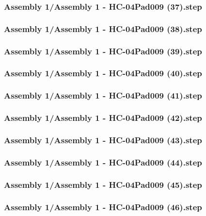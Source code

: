 \documentclass[a4paper,12pt]{article}
\begin{document}
\subsubsection{Assembly 1/Assembly 1 - HC-04Pad009 (37).step}

\subsubsection{Assembly 1/Assembly 1 - HC-04Pad009 (38).step}

\subsubsection{Assembly 1/Assembly 1 - HC-04Pad009 (39).step}

\subsubsection{Assembly 1/Assembly 1 - HC-04Pad009 (40).step}

\subsubsection{Assembly 1/Assembly 1 - HC-04Pad009 (41).step}

\subsubsection{Assembly 1/Assembly 1 - HC-04Pad009 (42).step}

\subsubsection{Assembly 1/Assembly 1 - HC-04Pad009 (43).step}

\subsubsection{Assembly 1/Assembly 1 - HC-04Pad009 (44).step}

\subsubsection{Assembly 1/Assembly 1 - HC-04Pad009 (45).step}

\subsubsection{Assembly 1/Assembly 1 - HC-04Pad009 (46).step}

\end{document}
